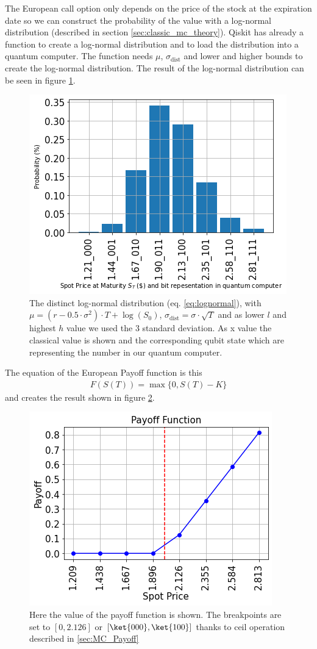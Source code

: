 \documentclass[a4paper, 12pt, one column, aas_macros]{article}
\begin{document}
The European call option only depends on the price of the stock at the expiration date so we can construct the probability of the value with a log-normal distribution (described in section \ref{sec:classic_mc_theory}). Qiskit has already a function to create a log-normal distribution and to load the distribution into a quantum computer. The function needs $\mu$, $\sigma_{\text{dist}}$ and lower and higher bounds to create the log-normal distribution. The result of the log-normal distribution can be seen in figure \ref{fig:E_log-normal}.
\begin{figure}[H]
  \begin{center}
    \includegraphics[width=0.5\linewidth]{images/probability.png}
  \end{center}
  \caption{The distinct log-normal distribution (eq. \ref{eq:lognormal}), with $\mu=(r-0.5\cdot \sigma^2)\cdot T + \log(S_0)$, $\sigma_{\text{dist}}=\sigma \cdot \sqrt{T}$ and as lower $l$ and highest $h$ value we used the 3 standard deviation. As x value the classical value is shown and the corresponding qubit state which are representing the number in our quantum computer.}
  \label{fig:E_log-normal}
\end{figure}

The equation of the European Payoff function is this
\begin{align}
    F(S(T)) = \max\{0, S(T) - K\} \label{eq:E_example_european}
\end{align}
and creates the result shown in figure \ref{fig:E_payoff_function}.
\begin{figure}[H]
  \begin{center}
    \includegraphics[width=0.5\linewidth]{images/payoff_european.png}
  \end{center}
  \caption{Here the value of the payoff function is shown. The breakpoints are set to $[0, 2.126]$ or $[\ket{000}, \ket{100}]$ thanks to ceil operation described in \ref{sec:MC_Payoff}}
  \label{fig:E_payoff_function}
\end{figure}
\end{document}
